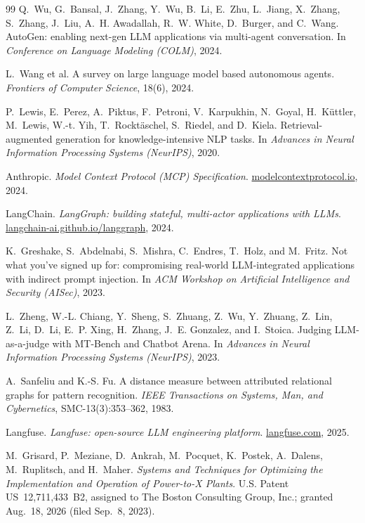 \documentclass[12pt,a4paper,oneside]{book}
\begin{document}
\begin{thebibliography}{99}
Q.~Wu, G.~Bansal, J.~Zhang, Y.~Wu, B.~Li, E.~Zhu, L.~Jiang, X.~Zhang, S.~Zhang,
J.~Liu, A.~H. Awadallah, R.~W. White, D.~Burger, and C.~Wang.
AutoGen: enabling next-gen LLM applications via multi-agent conversation.
In \emph{Conference on Language Modeling (COLM)}, 2024.

L.~Wang et al.
A survey on large language model based autonomous agents.
\emph{Frontiers of Computer Science}, 18(6), 2024.

P.~Lewis, E.~Perez, A.~Piktus, F.~Petroni, V.~Karpukhin, N.~Goyal,
H.~K\"{u}ttler, M.~Lewis, W.-t. Yih, T.~Rockt\"{a}schel, S.~Riedel, and
D.~Kiela.
Retrieval-augmented generation for knowledge-intensive NLP tasks.
In \emph{Advances in Neural Information Processing Systems (NeurIPS)}, 2020.

Anthropic.
\emph{Model Context Protocol (MCP) Specification}.
\href{https://modelcontextprotocol.io}{modelcontextprotocol.io}, 2024.

LangChain.
\emph{LangGraph: building stateful, multi-actor applications with LLMs}.
\href{https://langchain-ai.github.io/langgraph/}{langchain-ai.github.io/langgraph}, 2024.


K.~Greshake, S.~Abdelnabi, S.~Mishra, C.~Endres, T.~Holz, and M.~Fritz.
Not what you've signed up for: compromising real-world LLM-integrated
applications with indirect prompt injection.
In \emph{ACM Workshop on Artificial Intelligence and Security (AISec)}, 2023.

L.~Zheng, W.-L. Chiang, Y.~Sheng, S.~Zhuang, Z.~Wu, Y.~Zhuang, Z.~Lin, Z.~Li,
D.~Li, E.~P. Xing, H.~Zhang, J.~E. Gonzalez, and I.~Stoica.
Judging LLM-as-a-judge with MT-Bench and Chatbot Arena.
In \emph{Advances in Neural Information Processing Systems (NeurIPS)}, 2023.

A.~Sanfeliu and K.-S. Fu.
A distance measure between attributed relational graphs for pattern recognition.
\emph{IEEE Transactions on Systems, Man, and Cybernetics}, SMC-13(3):353--362,
1983.

Langfuse.
\emph{Langfuse: open-source LLM engineering platform}.
\href{https://langfuse.com}{langfuse.com}, 2025.


M.~Grisard, P.~Meziane, D.~Ankrah, M.~Pocquet, K.~Postek, A.~Dalens,
M.~Ruplitsch, and H.~Maher.
\emph{Systems and Techniques for Optimizing the Implementation and Operation of
Power-to-X Plants}.
U.S. Patent US~12,711,433~B2, assigned to The Boston Consulting Group, Inc.;
granted Aug.~18, 2026 (filed Sep.~8, 2023).

\end{thebibliography}
\end{document}
